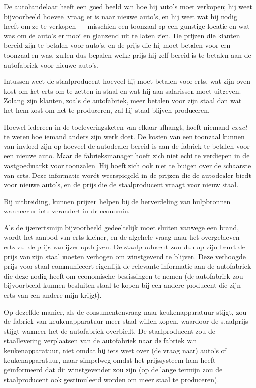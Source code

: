 \documentclass[
  a5paper,
  smalldemyvopaper,11pt,twoside,onecolumn,openright,extrafontsizes,
hidelinks]{memoir}
\begin{document}
De autohandelaar heeft een goed beeld van hoe hij auto's moet verkopen;
hij weet bijvoorbeeld hoeveel vraag er is naar nieuwe auto's, en hij
weet wat hij nodig heeft om ze te verkopen --- misschien een toonzaal op
een gunstige locatie en wat was om de auto's er mooi en glanzend uit te
laten zien. De prijzen die klanten bereid zijn te betalen voor auto's,
en de prijs die hij moet betalen voor een toonzaal en was, zullen dus
bepalen welke prijs hij zelf bereid is te betalen aan de autofabriek
voor nieuwe auto's.

Intussen weet de staalproducent hoeveel hij moet betalen voor erts, wat
zijn oven kost om het erts om te zetten in staal en wat hij aan
salarissen moet uitgeven. Zolang zijn klanten, zoals de autofabriek,
meer betalen voor zijn staal dan wat het hem kost om het te produceren,
zal hij staal blijven produceren.

Hoewel iedereen in de toeleveringsketen van elkaar afhangt, hoeft
niemand \emph{exact} te weten hoe iemand anders zijn werk doet. De
kosten van een toonzaal kunnen van invloed zijn op hoeveel de autodealer
bereid is aan de fabriek te betalen voor een nieuwe auto. Maar de
fabrieksmanager hoeft zich niet echt te verdiepen in de vastgoedmarkt
voor toonzalen. Hij hoeft zich ook niet te buigen over de schaarste van
erts. Deze informatie wordt weerspiegeld in de prijzen die de autodealer
biedt voor nieuwe auto's, en de prijs die de staalproducent vraagt voor
nieuw staal.

Bij uitbreiding, kunnen prijzen helpen bij de herverdeling van
hulpbronnen wanneer er iets verandert in de economie.

Als de ijzerertsmijn bijvoorbeeld gedeeltelijk moet sluiten vanwege een
brand, wordt het aanbod van erts kleiner, en de algehele vraag naar het
overgebleven erts zal de prijs van ijzer opdrijven. De staalproducent
zou dan op zijn beurt de prijs van zijn staal moeten verhogen om
winstgevend te blijven. Deze verhoogde prijs voor staal communiceert
eigenlijk de relevante informatie aan de autofabriek die deze nodig
heeft om economische beslissingen te nemen (de autofabriek zou
bijvoorbeeld kunnen besluiten staal te kopen bij een andere producent
die zijn erts van een andere mijn krijgt).

Op dezelfde manier, als de consumentenvraag naar keukenapparatuur
stijgt, zou de fabriek van keukenapparatuur meer staal willen kopen,
waardoor de staalprijs stijgt wanneer het de autofabriek overbiedt. De
staalproducent zou de staallevering verplaatsen van de autofabriek naar
de fabriek van keukenapparatuur, niet omdat hij iets weet over (de vraag
naar) auto's of keukenapparatuur, maar simpelweg omdat het prijssysteem
hem heeft geïnformeerd dat dit winstgevender zou zijn (op de lange
termijn zou de staalproducent ook gestimuleerd worden om meer staal te
produceren).
\end{document}
